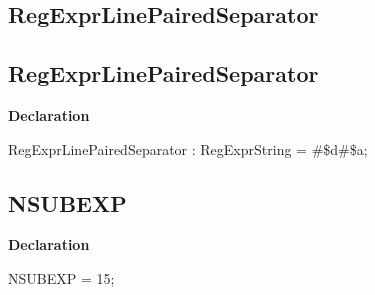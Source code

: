 \documentclass{report}
\newif\ifpdf
\begin{document}
\subsection*{\large{\textbf{RegExprLinePairedSeparator}}\normalsize\hspace{1ex}\hrulefill}
\else
\subsection*{RegExprLinePairedSeparator}
\fi
\label{RegExpr-RegExprLinePairedSeparator}
\begin{list}{}{
\setlength{\itemindent}{0cm}
\setlength{\listparindent}{0cm}
\setlength{\leftmargin}{\evensidemargin}
\addtolength{\leftmargin}{\tmplength}
\settowidth{\labelsep}{X}
\addtolength{\leftmargin}{\labelsep}
\setlength{\labelwidth}{\tmplength}
}
\item[\textbf{Declaration}\hfill]
\ifpdf
\begin{flushleft}
\fi
\begin{ttfamily}
RegExprLinePairedSeparator : RegExprString =   {\#}{\$}d{\#}{\$}a;\end{ttfamily}

\ifpdf
\end{flushleft}
\fi

\end{list}
\ifpdf
\subsection*{\large{\textbf{NSUBEXP}}\normalsize\hspace{1ex}\hrulefill}
\else
\subsection*{NSUBEXP}
\fi
\label{RegExpr-NSUBEXP}
\begin{list}{}{
\setlength{\itemindent}{0cm}
\setlength{\listparindent}{0cm}
\setlength{\leftmargin}{\evensidemargin}
\addtolength{\leftmargin}{\tmplength}
\settowidth{\labelsep}{X}
\addtolength{\leftmargin}{\labelsep}
\setlength{\labelwidth}{\tmplength}
}
\item[\textbf{Declaration}\hfill]
\ifpdf
\begin{flushleft}
\fi
\begin{ttfamily}
NSUBEXP = 15;\end{ttfamily}

\ifpdf
\end{flushleft}
\fi

\end{list}
\ifpdf
\end{document}
